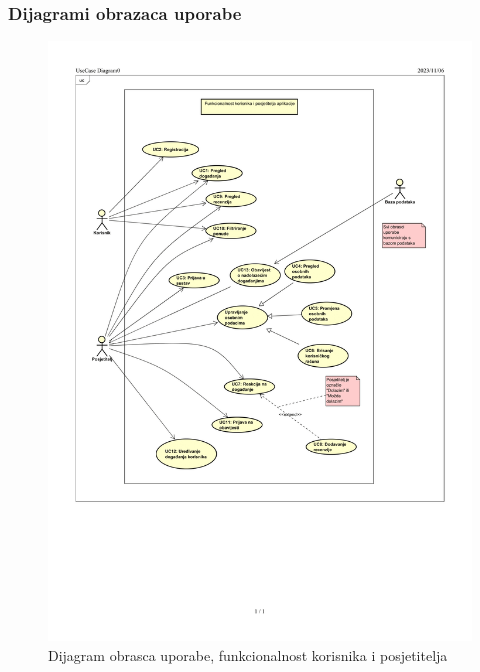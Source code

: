 					
					
				\eject	
				
					
				\subsubsection{Dijagrami obrazaca uporabe}
					
					
					\begin{figure}[H]
						\includegraphics[scale=0.6]{slike/UC_dijagram1-1.PNG} %
						\centering
						\caption{Dijagram obrasca uporabe, funkcionalnost korisnika i posjetitelja}
						\label{fig:promjene}
					\end{figure}
		
